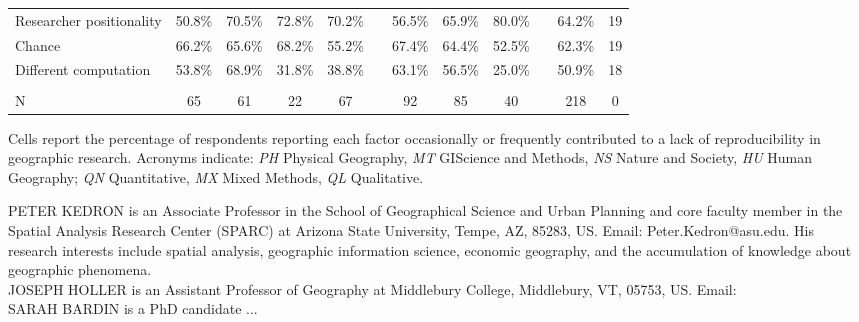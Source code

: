 \documentclass[]{interact}
\theoremstyle{plain}%
\theoremstyle{definition}
\theoremstyle{remark}
\begin{document}
\begin{landscape}
\begin{table}[h]
\begin{threeparttable}
\begin{tabular}{l c c c c c c c c c c c}
         Researcher positionality           & 50.8\% & 70.5\% & 72.8\% & 70.2\% & & 56.5\% & 65.9\% & 80.0\% &  & 64.2\% & 19\\
         Chance                             & 66.2\% & 65.6\% & 68.2\% & 55.2\% & & 67.4\% & 64.4\% & 52.5\% &  & 62.3\% & 19 \\
         Different computation              & 53.8\% & 68.9\% & 31.8\% & 38.8\% & & 63.1\% & 56.5\% & 25.0\% &  & 50.9\% & 18 \\
                                            & & & & & & & & & & &\\
         N                                  & 65 & 61 & 22 & 67 & & 92 & 85 & 40 & & 218 & 0 \\
        \hline
    \end{tabular}
    \begin{tablenotes}
        \footnotesize
        \item Cells report the percentage of respondents reporting each factor occasionally or frequently contributed to a lack of reproducibility in geographic research. Acronyms indicate: \textit{PH} Physical Geography, \textit{MT} GIScience and Methods, \textit{NS} Nature and Society, \textit{HU} Human Geography; \textit{QN} Quantitative, \textit{MX} Mixed Methods, \textit{QL} Qualitative. 
    \end{tablenotes}
    \label{tab:barriers}
    \end{threeparttable}
\end{table}
\end{landscape}
\newpage
\noindent PETER KEDRON is an Associate Professor in the School of Geographical Science and Urban Planning and core faculty member in the Spatial Analysis Research Center (SPARC) at Arizona State University, Tempe, AZ, 85283, US. Email: Peter.Kedron@asu.edu. His research interests include spatial analysis, geographic information science, economic geography, and the accumulation of knowledge about geographic phenomena. \\  
  
\noindent JOSEPH HOLLER is an Assistant Professor of Geography at Middlebury College, Middlebury, VT, 05753, US. Email: \\
  
\noindent SARAH BARDIN is a PhD candidate ...
\end{document}
